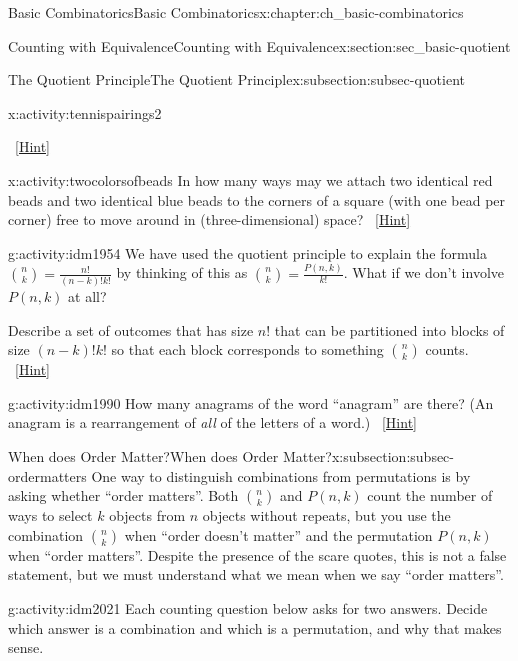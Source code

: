 \documentclass[oneside,10pt,]{book}
\numberwithin{equation}{chapter}
\begin{document}
\begin{chapterptx}{Basic Combinatorics}{}{Basic Combinatorics}{}{}{x:chapter:ch_basic-combinatorics}
\begin{sectionptx}{Counting with Equivalence}{}{Counting with Equivalence}{}{}{x:section:sec_basic-quotient}
\begin{subsectionptx}{The Quotient Principle}{}{The Quotient Principle}{}{}{x:subsection:subsec-quotient}
\begin{activity}{}{x:activity:tennispairings2}
\begin{enumerate}[font=\bfseries,label=(\alph*),ref=\alph*]
\qquad~\hfill{\tiny\hyperlink{g:hint:idm1923-back}{[Hint]}}\end{enumerate}
\end{activity}
\begin{activity}{}{x:activity:twocolorsofbeads}%
In how many ways may we attach two identical red beads and two identical blue beads to the corners of a square (with one bead per corner) free to move around in (three-dimensional) space?%
\qquad~\hfill{\tiny\hyperlink{g:hint:idm1946-back}{[Hint]}}\end{activity}
\begin{activity}{}{g:activity:idm1954}%
We have used the quotient principle to explain the formula \(\binom{n}{k} = \frac{n!}{(n-k)!k!}\) by thinking of this as \(\binom{n}{k} = \frac{P(n,k)}{k!}\).  What if we don't involve \(P(n,k)\) at all?%
\par
Describe a set of outcomes that has size \(n!\) that can be partitioned into blocks of size \((n-k)!k!\) so that each block corresponds to something \(\binom{n}{k}\) counts.%
\qquad~\hfill{\tiny\hyperlink{g:hint:idm1964-back}{[Hint]}}\end{activity}
\begin{activity}{}{g:activity:idm1990}%
How many anagrams of the word ``anagram'' are there? (An anagram is a rearrangement of \emph{all} of the letters of a word.)%
\qquad~\hfill{\tiny\hyperlink{g:hint:idm1995-back}{[Hint]}}\end{activity}
\end{subsectionptx}
%
%
\typeout{************************************************}
\typeout{************************************************}
%
\begin{subsectionptx}{When does Order Matter?}{}{When does Order Matter?}{}{}{x:subsection:subsec-ordermatters}
One way to distinguish combinations from permutations is by asking whether ``order matters''.  Both \(\binom{n}{k}\) and \(P(n,k)\) count the number of ways to select \(k\) objects from \(n\) objects without repeats, but you use the combination \(\binom{n}{k}\) when ``order doesn't matter'' and the permutation \(P(n,k)\) when ``order matters''.  Despite the presence of the scare quotes, this is not a false statement, but we must understand what we mean when we say ``order matters''.%
\begin{activity}{}{g:activity:idm2021}%
Each counting question below asks for two answers.  Decide which answer is a combination and which is a permutation, and why that makes sense.%

\end{activity}
\end{subsectionptx}
\end{sectionptx}
\end{chapterptx}
\end{document}
